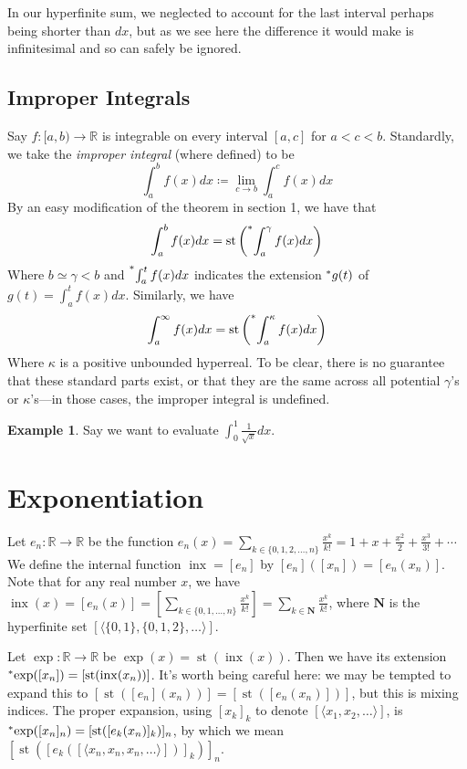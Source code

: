 \documentclass{article}
\newcommand{\stp}[1]{\st\left(#1\right)}
\newcommand{\reals}{\mathbb{R}}
\newcommand{\hr}[1]{\prescript{*}{}{#1}}
\DeclareMathOperator{\st}{st}
\DeclareMathOperator{\inx}{inx}
\theoremstyle{definition}
\newtheorem*{example}{Example}
\begin{document}
In our hyperfinite sum, we neglected to account for the last interval perhaps being shorter than $dx$, but as we see here the difference it would make is infinitesimal and so can safely be ignored.

\subsection{Improper Integrals}
Say $f: [a, b) \to \reals$ is integrable on every interval $[a, c]$ for $a < c < b$. Standardly, we take the \textit{improper integral} (where defined) to be
\[\int_a^b f(x)dx \coloneq \lim_{c \to b} \int_a^c f(x)dx\]
By an easy modification of the theorem in section 1, we have that
\[\int_a^b f(x)dx = \stp{\hr{\int_a^\gamma f(x)dx}}\]
Where $b \simeq \gamma < b$ and $\hr{\int_a^t f(x)dx}$ indicates the extension $\hr{g}(t)$ of $g(t) = \int_a^t f(x)dx$. Similarly, we have
\[\int_a^\infty f(x)dx = \stp{\hr{\int_a^\kappa f(x)dx}}\]
Where $\kappa$ is a positive unbounded hyperreal. To be clear, there is no guarantee that these standard parts exist, or that they are the same across all potential $\gamma$'s or $\kappa$'s---in those cases, the improper integral is undefined.

\begin{example}
    Say we want to evaluate $\int_0^1 \frac{1}{\sqrt{x}} dx$. 
\end{example}

\section{Exponentiation}

Let $e_n: \reals \to \reals$ be the function $e_n(x) = \sum_{k \in \{0, 1, 2, \ldots, n\}} \frac{x^k}{k!} = 1 + x + \frac{x^2}{2} + \frac{x^3}{3!} + \cdots$ We define the internal function $\inx = [e_n]$ by $[e_n]([x_n]) = [e_n(x_n)]$. Note that for any real number $x$, we have $\inx(x) = [e_n(x)] = [\sum_{k \in \{0, 1, \ldots, n\}} \frac{x^k}{k!}] = \sum_{k \in \mathbf{N}} \frac{x^k}{k!}$, where $\mathbf{N}$ is the hyperfinite set $[\langle \{0, 1\}, \{0, 1, 2\}, \ldots \rangle]$. 

Let $\exp: \reals \to \reals$ be $\exp(x) = \st(\inx(x))$. Then we have its extension $\hr{\exp}([x_n]) = [\st(\inx(x_n))]$. It's worth being careful here: we may be tempted to expand this to $[\st([e_n](x_n))] = [\st([e_n(x_n)])]$, but this is mixing indices. The proper expansion, using $[x_k]_k$ to denote $[\langle x_1, x_2, \ldots \rangle]$, is $\hr{\exp}([x_n]_n) = [\st([e_k(x_n)]_k)]_n$, by which we mean $[\st([e_k([\langle x_n, x_n, x_n, \ldots \rangle])]_k)]_n$.
\end{document}
